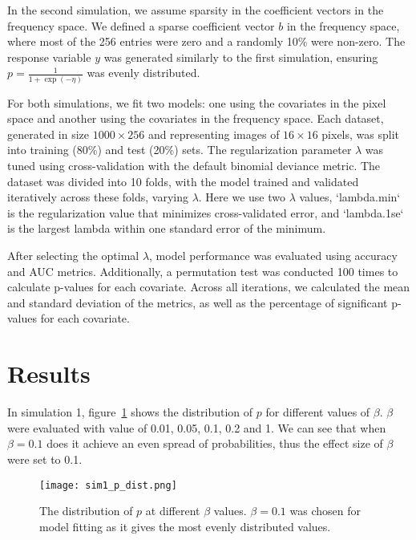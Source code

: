 \documentclass[12pt]{article}
\begin{document}
In the second simulation, we assume sparsity in the coefficient vectors in the
frequency space. We defined a sparse coefficient vector \( b \) in the
frequency space, where most of the 256 entries were zero and a randomly 10\%
were non-zero. The response variable \( y \) was generated similarly to the
first simulation, ensuring \( p = \frac{1}{1 + \exp(-\eta)} \) was evenly
distributed.

For both simulations, we fit two models: one using the covariates in the pixel
space and another using the covariates in the frequency space. Each dataset,
generated in size \( 1000 \times 256 \) and representing images of \( 16 \times
16 \) pixels, was split into training (80\%) and test (20\%) sets. The
regularization parameter \( \lambda \) was tuned using cross-validation with
the default binomial deviance metric. The dataset was divided into 10 folds,
with the model trained and validated iteratively across these folds, varying \(
\lambda \). Here we use two \( \lambda \) values, `lambda.min` is the
regularization value that minimizes cross-validated error, and `lambda.1se` is
the largest lambda within one standard error of the minimum.

After selecting the optimal \( \lambda \), model performance was evaluated
using accuracy and AUC metrics. Additionally, a permutation test was conducted
100 times to calculate p-values for each covariate. Across all iterations, we
calculated the mean and standard deviation of the metrics, as well as the
percentage of significant p-values for each covariate.

\section*{Results}

In simulation 1, figure~\ref{fig:sim1_p_dist} shows the distribution of 
\( p \) for different values of \( \beta	\). \( \beta \) were evaluated with
value of 0.01, 0.05, 0.1, 0.2 and 1. We can see that when \( \beta = 0.1 \) does
it achieve an even spread of probabilities, thus the effect size of \( \beta \)
were set to 0.1.

\begin{figure}[H] 
	\centering
	\texttt{[image: sim1\_p\_dist.png]} 
	\caption{The distribution of \(p\) at different \(\beta\) values. \(\beta = 0.1\) was
chosen for model fitting as it gives the most evenly distributed values.}
	\label{fig:sim1_p_dist} 
\end{figure}
\end{document}
